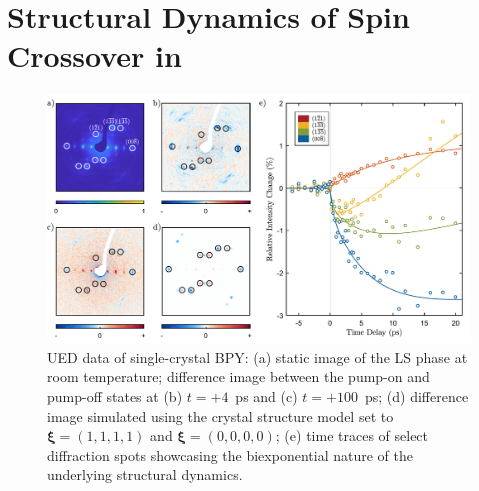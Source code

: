 \section[Structural Dynamics of Spin Crossover in \protect{[Fe\textsuperscript{II}(bpy)\textsubscript{3}](PF\textsubscript{6})\textsubscript{2}}]{Structural Dynamics of Spin Crossover in \\ }
\label{sec: UED-BPY}

\begin{figure}[b!]
  \centering
  \includegraphics[width = \textwidth]{Figures/fig_BPY_UEDimages.pdf}
  \caption[UED data of single-crystal BPY.]{
    UED data of single-crystal BPY:
    (a) static image of the LS phase at room temperature;
    difference image between the pump-on and pump-off states
    at (b) $t = +4$~ps and (c) $t = +100$~ps;
    (d) difference image simulated using the crystal structure model
    set to $\boldsymbol{\xi} = (1, 1, 1, 1)$ and $\boldsymbol{\xi} = (0, 0, 0, 0)$;
    (e) time traces of select diffraction spots showcasing
    the biexponential nature of the underlying structural dynamics.
  }
  \label{fig: BPY-UEDimages}
\end{figure}

